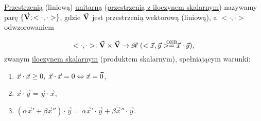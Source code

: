 \begin{mydef}
   \underline{Przestrzenią} (liniową) \underline{unitarną} (\underline{przestrzenią z iloczynem skalarnym}) nazywamy parę $\{\vec{\mathbf{V}}; <\cdot, \cdot>\}$, gdzie $\vec{\mathbf{V}}$ jest przestrzenią wektorową (liniową), a $<\cdot, \cdot>$ odwzorowaniem
   
   \[<\cdot, \cdot>: \vset{V} \times \vset{V} \to \real \; (<\vec{x}, \vec{y}> \ozn \vec{x} \cdot \vec{y}),\]
   zwanym \underline{iloczynem skalarnym} (produktem skalarnym), spełniającym warunki:
   
   \begin{enumerate}
    \item $\vec{x} \cdot \vec{x} \geq 0, \; \vec{x} \cdot \vec{x} = 0 \Leftrightarrow \vec{x} = \vec{0}$,
    \item $\vec{x} \cdot \vec{y} = \vec{y} \cdot \vec{x}$,
    \item $(\alpha \vec{x}' + \beta \vec{x}'') \cdot \vec{y} = \alpha \vec{x}' \cdot \vec{y} + \beta \vec{x}'' \cdot \vec{y}$.
   \end{enumerate}

\end{mydef}

